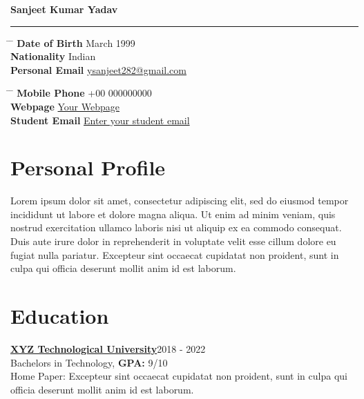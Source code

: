 \documentclass[10pt]{article}
\begin{document}
{\centering
\color{battleshipgrey}
{\bf\huge Sanjeet Kumar Yadav}\\
\rule{19cm}{0.5pt}}

\indent\indent
\parbox{\textwidth}{ 
	\begin{tabbing}
		\hspace{3cm} \= \hspace{4cm} \= \kill 
		{\bf Date of Birth}  March 1999 \\
		{\bf Nationality} \> Indian \\
		{\bf Personal Email} \> \href{mailto:ysanjeet282@gmail.com}{ysanjeet282@gmail.com} 
	\end{tabbing}
}
\indent\indent\indent\indent 
\parbox{\textwidth}{ 
	\begin{tabbing} 
		\hspace{3cm} \= \hspace{4cm} \= \kill 
		{\bf Mobile Phone} \> +00 000000000 \\
		{\bf Webpage} \> \href{webpage.io}{Your Webpage} \\ 
		{\bf Student Email} \> \href{mailto:example@xyz.com}{Enter your student email} 
	\end{tabbing}
}


\section{{\color{battleshipgrey}Personal Profile}}
	Lorem ipsum dolor sit amet, consectetur adipiscing elit, sed do eiusmod tempor incididunt ut labore et dolore magna aliqua. Ut enim ad minim veniam, quis nostrud exercitation ullamco laboris nisi ut aliquip ex ea commodo consequat. Duis aute irure dolor in reprehenderit in voluptate velit esse cillum dolore eu fugiat nulla pariatur. Excepteur sint occaecat cupidatat non proident, sunt in culpa qui officia deserunt mollit anim id est laborum.


\section{{\color{battleshipgrey}Education}}
	\href{http://yourinstitute.edu}{\bf XYZ Technological University}\hfill 2018 - 2022 \\
	Bachelors in Technology, {\bf GPA:} 9/10 \\
	Home Paper: Excepteur sint occaecat cupidatat non proident, sunt in culpa qui officia deserunt mollit anim id est laborum.
\end{document}
